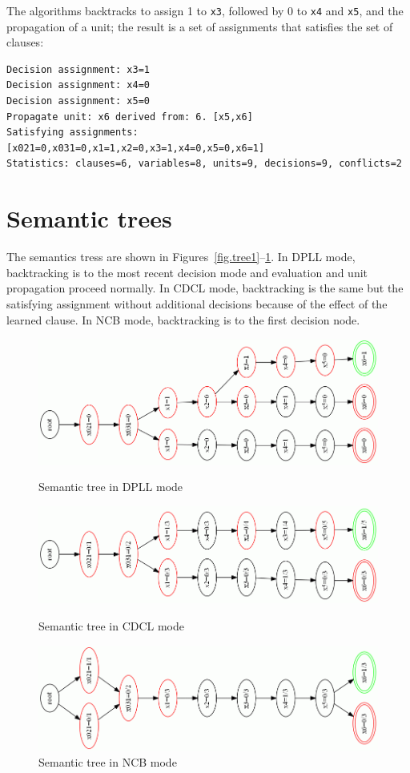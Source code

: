 \documentclass[11pt]{report}
\newcommand*{\p}[1]{\textup{\texttt{#1}}}
\begin{document}
The algorithms backtracks to assign 1 to \p{x3}, followed by 0 to \p{x4}
and \p{x5}, and the propagation of a unit; the result is a set of
assignments that satisfies the set of clauses:
\begin{verbatim}
Decision assignment: x3=1
Decision assignment: x4=0
Decision assignment: x5=0
Propagate unit: x6 derived from: 6. [x5,x6]
Satisfying assignments:
[x021=0,x031=0,x1=1,x2=0,x3=1,x4=0,x5=0,x6=1]
Statistics: clauses=6, variables=8, units=9, decisions=9, conflicts=2
\end{verbatim}

\section{Semantic trees}

The semantics tress are shown in
Figures~\ref{fig.tree1}--\ref{fig.tree3}. In DPLL mode, backtracking is
to the most recent decision mode and evaluation and unit propagation
proceed normally. In CDCL mode, backtracking is the same but the
satisfying assignment without additional decisions because of the effect
of the learned clause. In NCB mode, backtracking is to the first
decision node.

\begin{figure}
\begin{center}
\includegraphics[keepaspectratio=true,width=.9\textwidth]{tree1}
\caption{Semantic tree in DPLL mode}\label{fig.tree1}

\bigskip
\bigskip
\bigskip

\includegraphics[keepaspectratio=true,width=.9\textwidth]{tree2}
\caption{Semantic tree in CDCL mode}\label{fig.tree2}

\bigskip
\bigskip
\bigskip

\includegraphics[keepaspectratio=true,width=.9\textwidth]{tree3}
\end{center}
\caption{Semantic tree in NCB mode}\label{fig.tree3}
\end{figure}
\end{document}
